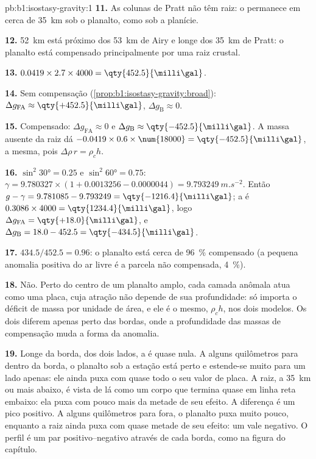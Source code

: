 \begin{solution}{pb:b1:isostasy-gravity:1}
\textbf{11.} As colunas de Pratt não têm raiz: o  permanece em cerca de \qty{35}{km}
sob o planalto, como sob a planície.

\textbf{12.} \qty{52}{km} está próximo dos \qty{53}{km} de Airy e longe dos
\qty{35}{km} de Pratt: o planalto está compensado principalmente por uma raiz crustal.

\textbf{13.} $0.0419\times2.7\times4000 = \qty{452.5}{\milli\gal}$.

\textbf{14.} Sem compensação (\cref{prop:b1:isostasy-gravity:broad}):
$\Delta g_{\mathrm{FA}} \approx \qty{+452.5}{\milli\gal}$,
$\Delta g_{\mathrm B} \approx 0$.

\textbf{15.} Compensado: $\Delta g_{\mathrm{FA}} \approx 0$ e
$\Delta g_{\mathrm B} \approx \qty{-452.5}{\milli\gal}$. A massa ausente da raiz
dá $-0.0419\times0.6\times\num{18000} = \qty{-452.5}{\milli\gal}$, a mesma,
pois $\Delta\rho\,r = \rho_c h$.

\textbf{16.} $\sin^2\ang{30} = 0.25$ e $\sin^2\ang{60} = 0.75$:
$\gamma = 9.780327\times(1 + 0.0013256 - 0.0000044) = \qty{9.793249}{m.s^{-2}}$.
Então $g - \gamma = 9.781085 - 9.793249 = \qty{-1216.4}{\milli\gal}$; a 
é $0.3086\times4000 = \qty{1234.4}{\milli\gal}$, logo
$\Delta g_{\mathrm{FA}} = \qty{+18.0}{\milli\gal}$, e
$\Delta g_{\mathrm B} = 18.0 - 452.5 = \qty{-434.5}{\milli\gal}$.

\textbf{17.} $434.5/452.5 = 0.96$: o planalto está cerca de \qty{96}{\percent}
compensado (a pequena anomalia positiva do ar livre é a parcela não compensada,
\qty{4}{\percent}).

\textbf{18.} Não. Perto do centro de um planalto amplo, cada camada anômala atua
como uma placa, cuja atração não depende de sua profundidade: só importa o déficit de massa
por unidade de área, e ele é o mesmo, $\rho_c h$, nos dois modelos. Os dois
diferem apenas perto das bordas, onde a profundidade das massas de compensação muda
a forma da anomalia.

\textbf{19.} Longe da borda, dos dois lados, a  é quase nula.
A alguns quilômetros para dentro da borda, o planalto sob a estação está perto e
estende-se muito para um lado apenas: ele ainda puxa com quase todo o seu valor de placa.
A raiz, a \qty{35}{km} ou mais abaixo, é vista de lá como um corpo que termina
quase em linha reta embaixo: ela puxa com pouco mais da metade de seu efeito. A
diferença é um pico positivo. A alguns quilômetros para fora, o planalto puxa
muito pouco, enquanto a raiz ainda puxa com quase metade de seu efeito: um vale negativo.
O perfil é um par positivo--negativo através de cada borda, como na figura
do capítulo.


\end{solution}
